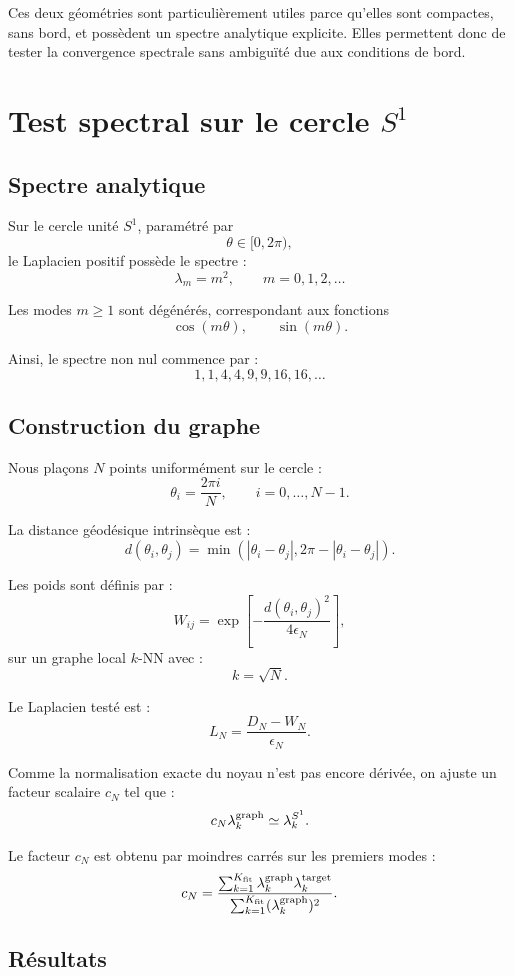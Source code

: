 \documentclass[11pt,a4paper]{article}
\begin{document}
Ces deux géométries sont particulièrement utiles parce qu'elles sont compactes,
sans bord, et possèdent un spectre analytique explicite. Elles permettent donc
de tester la convergence spectrale sans ambiguïté due aux conditions de bord.

\section{Test spectral sur le cercle \(S^1\)}

\subsection{Spectre analytique}

Sur le cercle unité \(S^1\), paramétré par
\[
\theta\in[0,2\pi),
\]
le Laplacien positif possède le spectre :
\[
\lambda_m=m^2,
\qquad
m=0,1,2,\ldots
\]

Les modes \(m\geq1\) sont dégénérés, correspondant aux fonctions
\[
\cos(m\theta),
\qquad
\sin(m\theta).
\]

Ainsi, le spectre non nul commence par :
\[
1,1,4,4,9,9,16,16,\ldots
\]

\subsection{Construction du graphe}

Nous plaçons \(N\) points uniformément sur le cercle :
\[
\theta_i=\frac{2\pi i}{N},
\qquad
i=0,\ldots,N-1.
\]

La distance géodésique intrinsèque est :
\[
d(\theta_i,\theta_j)
=
\min\left(
|\theta_i-\theta_j|,
2\pi-|\theta_i-\theta_j|
\right).
\]

Les poids sont définis par :
\[
W_{ij}
=
\exp\left[
-\frac{d(\theta_i,\theta_j)^2}{4\epsilon_N}
\right],
\]
sur un graphe local \(k\)-NN avec :
\[
k=\sqrt{N}.
\]

Le Laplacien testé est :
\[
L_N=\frac{D_N-W_N}{\epsilon_N}.
\]

Comme la normalisation exacte du noyau n'est pas encore dérivée, on ajuste un
facteur scalaire \(c_N\) tel que :
\[
c_N\lambda_k^{\rm graph}
\simeq
\lambda_k^{S^1}.
\]

Le facteur \(c_N\) est obtenu par moindres carrés sur les premiers modes :
\[
c_N
=
\frac{
\sum_{k=1}^{K_{\rm fit}}
\lambda_k^{\rm graph}\lambda_k^{\rm target}
}{
\sum_{k=1}^{K_{\rm fit}}
(\lambda_k^{\rm graph})^2
}.
\]

\subsection{Résultats}
\end{document}
